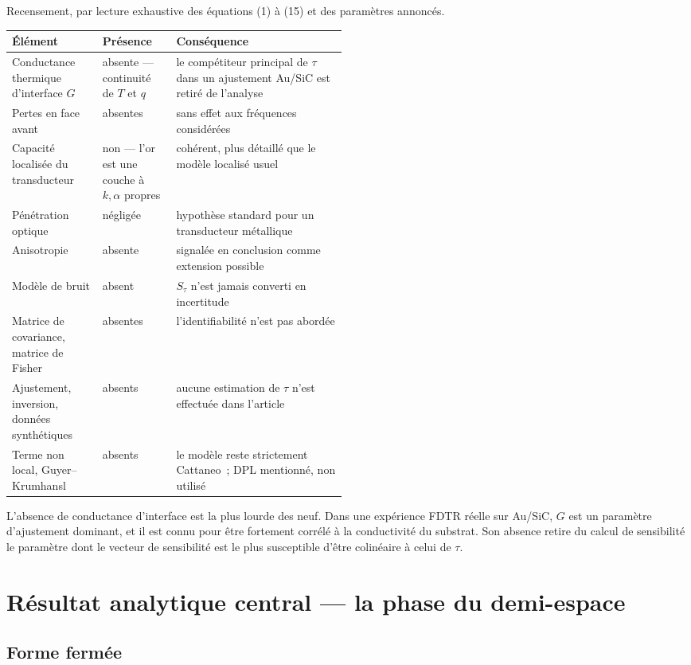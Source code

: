 \documentclass[11pt,a4paper]{article}
\begin{document}
Recensement, par lecture exhaustive des équations (1) à (15) et des paramètres annoncés.

\smallskip
{\small
\begin{tabularx}{\linewidth}{@{}L{0.27\linewidth} L{0.22\linewidth} X@{}}
\toprule
\textbf{Élément} & \textbf{Présence} & \textbf{Conséquence} \\
\midrule
Conductance thermique d'interface $G$ & absente --- continuité de $T$ et $q$ &
le compétiteur principal de $\tau$ dans un ajustement Au/SiC est retiré de l'analyse \\
Pertes en face avant & absentes & sans effet aux fréquences considérées \\
Capacité localisée du transducteur & non --- l'or est une couche à $k,\alpha$ propres &
cohérent, plus détaillé que le modèle localisé usuel \\
Pénétration optique & négligée & hypothèse standard pour un transducteur métallique \\
Anisotropie & absente & signalée en conclusion comme extension possible \\
Modèle de bruit & absent & $S_\tau$ n'est jamais converti en incertitude \\
Matrice de covariance, matrice de Fisher & absentes & l'identifiabilité n'est pas abordée \\
Ajustement, inversion, données synthétiques & absents &
aucune estimation de $\tau$ n'est effectuée dans l'article \\
Terme non local, Guyer--Krumhansl & absents &
le modèle reste strictement Cattaneo~; DPL mentionné, non utilisé \\
\bottomrule
\end{tabularx}}

\smallskip
L'absence de conductance d'interface est la plus lourde des neuf. Dans une expérience FDTR
réelle sur Au/SiC, $G$ est un paramètre d'ajustement dominant, et il est connu pour être
fortement corrélé à la conductivité du substrat. Son absence retire du calcul de sensibilité le
paramètre dont le vecteur de sensibilité est le plus susceptible d'être colinéaire à celui de
$\tau$.

\section{Résultat analytique central --- la phase du demi-espace}

\subsection{Forme fermée}
\end{document}
